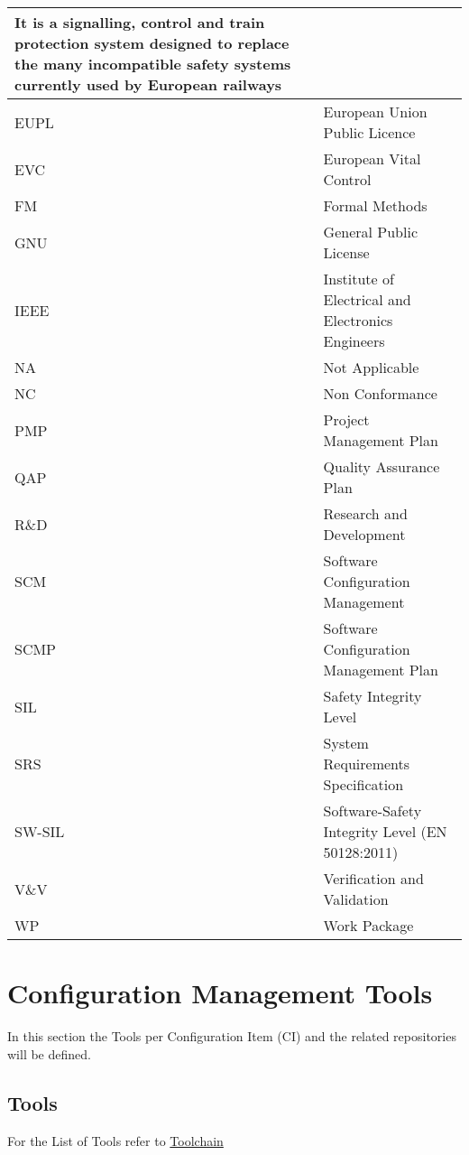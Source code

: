 \documentclass{template/openetcs_article}
\begin{document}
\begin{center}
\begin{longtable}{|m{3cm}m{11cm}|}
It is a signalling, control and train protection system designed to replace the many incompatible safety systems currently used by European railways\\\hline
EUPL &
European Union Public Licence\\\hline
EVC &
European Vital Control\\\hline
FM &
Formal Methods\\\hline
GNU &
General Public License\\\hline
IEEE &
Institute of Electrical and Electronics Engineers\\\hline
NA &
Not Applicable\\\hline
NC &
Non Conformance\\\hline
PMP &
Project Management Plan\\\hline
QAP &
Quality Assurance Plan\\\hline
R\&D &
Research and Development\\\hline
SCM &
Software Configuration Management\\\hline
SCMP &
Software Configuration Management Plan\\\hline
SIL &
Safety Integrity Level\\\hline
SRS &
System Requirements Specification\\\hline
SW-SIL &
Software-Safety Integrity Level (EN 50128:2011)\\\hline
V\&V &
Verification and Validation\\\hline
WP &
Work Package\\\hline
\end{longtable}
\end{center}


\section{Configuration Management Tools} %
\label {Configuration Management Tools}
In this section the Tools per Configuration Item (CI) and the related repositories will be defined. 


\subsection{Tools} %
For the List of Tools refer to \href{https://github.com/openETCS/toolchain/blob/master/DescriptionOfWork/ToolchainDescriptionOfWork.pdf}{Toolchain} 
\end{document}
